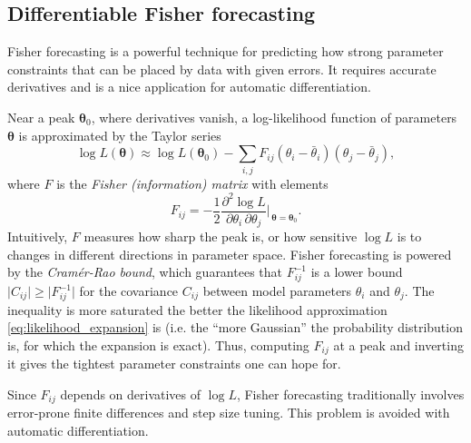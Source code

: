 \documentclass{aa}
\begin{document}
\subsection{Differentiable Fisher forecasting}
\label{sec:fisher}

Fisher forecasting is a powerful technique for predicting how strong parameter constraints that can be placed by data with given errors.
It requires accurate derivatives and is a nice application for automatic differentiation.

Near a peak $\boldsymbol{\theta}_0$, where derivatives vanish, a log-likelihood function of parameters $\boldsymbol{\theta}$ is approximated by the Taylor series
\begin{equation}
    \log L(\boldsymbol{\theta}) \approx \log L(\boldsymbol{\theta}_0) - \sum_{i,j} F_{ij} (\theta_i - \bar{\theta}_i) (\theta_j - \bar{\theta}_j),
\label{eq:likelihood_expansion}
\end{equation}
where $F$ is the \textit{Fisher (information) matrix} with elements
\begin{equation}
    F_{ij} = -\frac12 \frac{\partial^2 \log L}{\partial \theta_i \, \partial \theta_j} \bigg\rvert_{\,\boldsymbol{\theta} = \boldsymbol{\theta}_0} .
\label{eq:fisher_general}
\end{equation}
Intuitively, $F$ measures how sharp the peak is, or how sensitive $\log L$ is to changes in different directions in parameter space.
Fisher forecasting is powered by the \textit{Cramér-Rao bound}, which guarantees that $F^{-1}_{ij}$ is a lower bound $\big\lvert C_{ij}\big\rvert \geq \big\lvert F^{-1}_{ij} \big\rvert$ for the covariance $C_{ij}$ between model parameters $\theta_i$ and $\theta_j$.
The inequality is more saturated the better the likelihood approximation \eqref{eq:likelihood_expansion} is (i.e. the \enquote{more Gaussian} the probability distribution is, for which the expansion is exact).
Thus, computing $F_{ij}$ at a peak and inverting it gives the tightest parameter constraints one can hope for.

Since $F_{ij}$ depends on derivatives of $\log L$, Fisher forecasting traditionally involves error-prone finite differences and step size tuning.
This problem is avoided with automatic differentiation.
\end{document}

